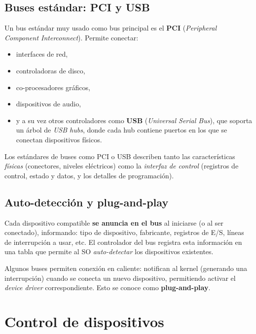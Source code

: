 \documentclass[11pt,a4paper]{article}
\begin{document}
\subsection{Buses estándar: PCI y USB}

Un bus estándar muy usado como bus principal es el \textbf{PCI}
(\emph{Peripheral Component Interconnect}). Permite conectar:

\begin{itemize}[leftmargin=*,nosep]
    \item interfaces de red,
    \item controladoras de disco,
    \item co-procesadores gráficos,
    \item dispositivos de audio,
    \item y a su vez otros controladores como \textbf{USB}
        (\emph{Universal Serial Bus}), que soporta un árbol de
        \emph{USB hubs}, donde cada hub contiene puertos en los que se
        conectan dispositivos físicos.
\end{itemize}

Los estándares de buses como PCI o USB describen tanto las
características \emph{físicas} (conectores, niveles eléctricos) como la
\emph{interfaz de control} (registros de control, estado y datos, y
los detalles de programación).

\subsection{Auto-detección y plug-and-play}

Cada dispositivo compatible \textbf{se anuncia en el bus} al iniciarse
(o al ser conectado), informando: tipo de dispositivo, fabricante,
registros de E/S, líneas de interrupción a usar, etc. El controlador
del bus registra esta información en una tabla que permite al SO
\emph{auto-detectar} los dispositivos existentes.

Algunos buses permiten conexión en caliente: notifican al kernel
(generando una interrupción) cuando se conecta un nuevo dispositivo,
permitiendo activar el \emph{device driver} correspondiente. Esto se
conoce como \textbf{plug-and-play}.

\section{Control de dispositivos}
\end{document}
